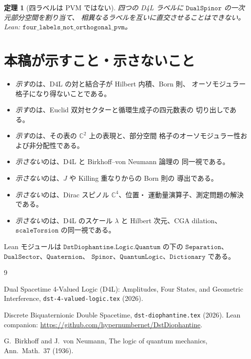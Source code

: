 \documentclass[dvipdfmx,11pt,a4paper]{jsarticle}
\newtheorem{theorem}{定理}[section]
\theoremstyle{definition}
\theoremstyle{remark}
\begin{document}
\begin{theorem}[四ラベルは PVM ではない]
\label{thm:pvm}
四つの D4L ラベルに $\texttt{DualSpinor}$ の一次元部分空間を割り当て、
相異なるラベルを互いに直交させることはできない。Lean:
$\texttt{four\_labels\_not\_orthogonal\_pvm}$。
\end{theorem}

\section{本稿が示すこと・示さないこと}
\label{sec:claims}

\begin{itemize}[leftmargin=1.4em]
  \item \emph{示す}のは、D4L の対と結合子が Hilbert 内積、Born 則、
        オーソモジュラー格子になり得ないことである。
  \item \emph{示す}のは、Euclid 双対セクターと循環生成子の四元数表の
        切り出しである。
  \item \emph{示す}のは、その表の $\mathbb{C}^2$ 上の表現と、部分空間
        格子のオーソモジュラー性および非分配性である。
  \item \emph{示さない}のは、D4L と Birkhoff--von Neumann 論理の
        同一視である。
  \item \emph{示さない}のは、$J$ や Killing 重なりからの Born 則の
        導出である。
  \item \emph{示さない}のは、Dirac スピノル $\mathbb{C}^4$、位置・
        運動量演算子、測定問題の解決である。
  \item \emph{示さない}のは、D4L のスケール $\lambda$ と Hilbert
        次元、CGA dilation、$\texttt{scaleTorsion}$ の同一視である。
\end{itemize}

Lean モジュールは $\texttt{DstDiophantine.Logic.Quantum}$ の下の
$\texttt{Separation}$、$\texttt{DualSector}$、$\texttt{Quaternion}$、
$\texttt{Spinor}$、$\texttt{QuantumLogic}$、$\texttt{Dictionary}$
である。

\begin{thebibliography}{9}
\raggedright

Dual Spacetime 4-Valued Logic (D4L): Amplitudes, Four States, and
Geometric Interference,
\texttt{dst-4-valued-logic.tex} (2026).

Discrete Biquaternionic Double Spacetime,
\texttt{dst-diophantine.tex} (2026). Lean companion:
\url{https://github.com/hypernumbernet/DstDiophantine}.

G.~Birkhoff and J.~von Neumann, The logic of quantum mechanics,
Ann.\ Math.\ 37 (1936).

\end{thebibliography}
\end{document}
